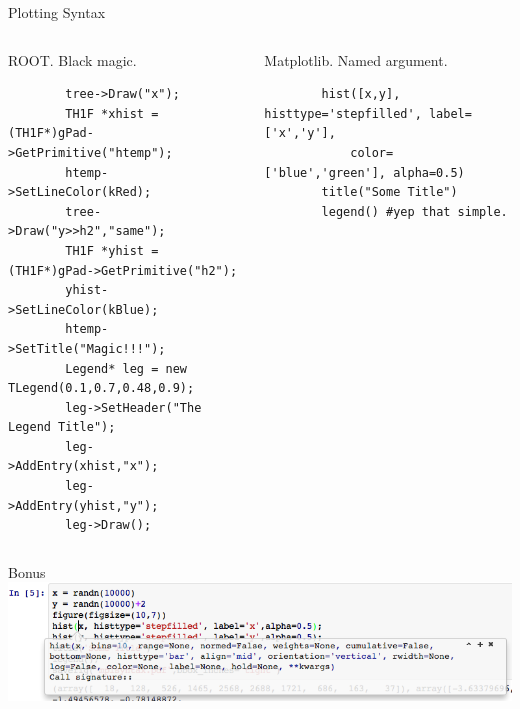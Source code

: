 \documentclass{beamer}
\begin{document}
\begin{frame}[fragile, shrink=37]{Plotting Syntax}
	\begin{columns}[t]
	\begin{column}{0.5\textwidth}
	\begin{block}{ROOT. Black magic.}
	\begin{verbatim}
		tree->Draw("x");
		TH1F *xhist = (TH1F*)gPad->GetPrimitive("htemp");
		htemp->SetLineColor(kRed);
		tree->Draw("y>>h2","same");
		TH1F *yhist = (TH1F*)gPad->GetPrimitive("h2");
		yhist->SetLineColor(kBlue);
		htemp->SetTitle("Magic!!!");
		Legend* leg = new TLegend(0.1,0.7,0.48,0.9);
		leg->SetHeader("The Legend Title");
		leg->AddEntry(xhist,"x");
		leg->AddEntry(yhist,"y");
		leg->Draw();
	\end{verbatim}
	\end{block}
	\end{column}
	\begin{column}{0.5\textwidth}
	\begin{block}{Matplotlib. Named argument.}
		\begin{verbatim}
		hist([x,y], histtype='stepfilled', label=['x','y'], 
            color=['blue','green'], alpha=0.5)
		title("Some Title")
		legend() #yep that simple.
		\end{verbatim}
	\end{block}
	\end{column}
	\end{columns}
	\begin{block}{Bonus}
	\includegraphics[width=\textwidth]{pic/ipython_doc.png}
	\end{block}
\end{frame}
\end{document}
